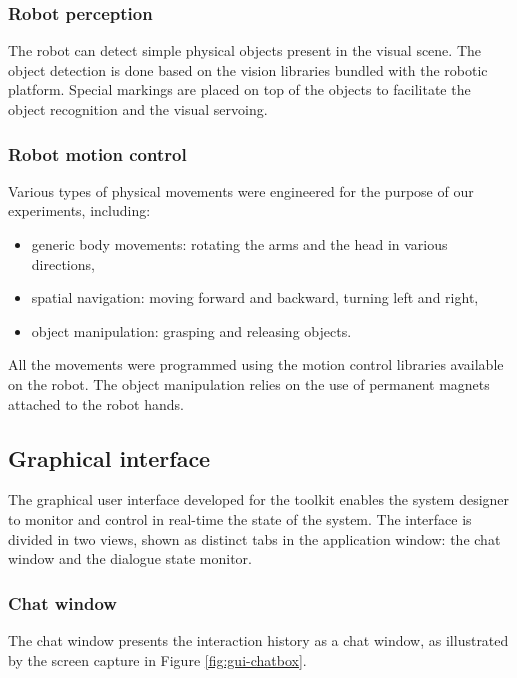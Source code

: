 \subsubsection*{Robot perception}

The robot can detect simple physical objects present in the visual scene. The object detection is done based on the vision libraries bundled with the robotic platform. Special markings are placed on top of the objects to facilitate the object recognition and the visual servoing.  

\subsubsection*{Robot motion control}

Various types of physical movements were engineered for the purpose of our experiments, including: \begin{itemize}
\item generic body movements: rotating the arms and the head in various directions,
\item spatial navigation: moving forward and backward, turning left and right,
\item object manipulation: grasping and releasing objects.  
\end{itemize}

All the movements were programmed using the motion control libraries available on the robot. The object manipulation relies on the use of permanent magnets attached to the robot hands. 


\subsection{Graphical interface}

The graphical user interface developed for the \opendial{} toolkit enables the system designer to monitor and control in real-time the state of the system.  The interface is divided in two  views, shown as distinct tabs in the application window: the chat window and the dialogue state monitor.

\subsubsection*{Chat window}
The chat window presents the interaction history as a chat window, as illustrated by the screen capture in Figure \ref{fig:gui-chatbox}.


